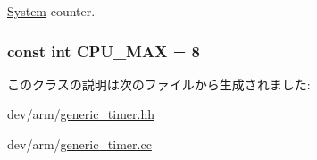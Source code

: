 \hyperlink{classSystem}{System} counter. \hypertarget{classGenericTimer_a4b102c882c8ecd5172c3f918fcde9c6d}{
\subsubsection[{CPU\_\-MAX}]{\setlength{\rightskip}{0pt plus 5cm}const int {\bf CPU\_\-MAX} = 8}}
\label{classGenericTimer_a4b102c882c8ecd5172c3f918fcde9c6d}


このクラスの説明は次のファイルから生成されました:\begin{DoxyCompactItemize}
\item 
dev/arm/\hyperlink{generic__timer_8hh}{generic\_\-timer.hh}\item 
dev/arm/\hyperlink{generic__timer_8cc}{generic\_\-timer.cc}\end{DoxyCompactItemize}
